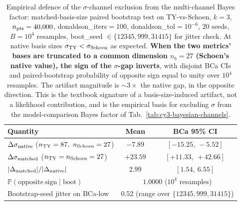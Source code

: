 \begin{table}[t]
\centering
\caption{Empirical defence of the $\sigma$-channel exclusion from the multi-channel Bayes factor: matched-basis-size paired bootstrap test on TY-vs-Schoen, $k=3$, $n_{\rm pts}=40{,}000$, donaldson\_iters$=100$, donaldson\_tol$=10^{-6}$, $20$ seeds, $B=10^4$ resamples, boot\_seed $\in \{12345, 999, 31415\}$ for jitter check. At native basis sizes $\sigma_{\rm TY}<\sigma_{\rm Schoen}$ as expected. \textbf{When the two metrics' bases are truncated to a common dimension $n_b=27$ (Schoen's native value), the sign of the $\sigma$-gap inverts}, with disjoint BCa CIs and paired-bootstrap probability of opposite sign equal to unity over $10^4$ resamples. The artifact magnitude is $\sim 3\times$ the native gap, in the opposite direction. This is the textbook signature of a basis-size-induced artifact, not a likelihood contribution, and is the empirical basis for excluding $\sigma$ from the model-comparison Bayes factor of Tab.~\ref{tab:cy3-bayesian-channels}.}
\label{tab:cy3-sigma-artifact}
\begin{ruledtabular}
\begin{tabular}{lcc}
Quantity & Mean & BCa 95\% CI \\
\hline
$\Delta\sigma_{\rm native}$ ($n_{\rm TY}=87,\ n_{\rm Schoen}=27$) & $-7.89$ & $[-15.25,\ -5.52]$ \\
$\Delta\sigma_{\rm matched}$ ($n_{\rm TY}=n_{\rm Schoen}=27$)  & $\mathbf{+23.59}$ & $\mathbf{[+11.33,\ +42.66]}$ \\
$|\Delta_{\rm matched}|/|\Delta_{\rm native}|$ & $2.99$ & $[1.54,\ 6.55]$ \\
\hline
$\mathbb{P}(\mathrm{opposite\ sign}\mid \mathrm{boot})$ & \multicolumn{2}{c}{$\mathbf{1.0000}$ ($10^4$ resamples)} \\
Bootstrap-seed jitter on BCa-low & \multicolumn{2}{c}{$0.52$ (range over $\{12345, 999, 31415\}$)} \\
\end{tabular}
\end{ruledtabular}
\end{table}

